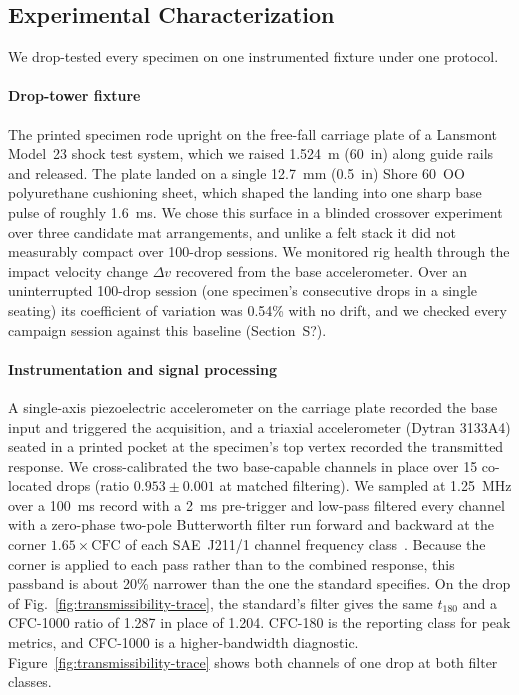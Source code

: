 \documentclass[11pt]{article}
\providecommand{\siref}[1]{S?}
\begin{document}
\subsection{Experimental Characterization}
\label{sec:methods:testing}

We drop-tested every specimen on one instrumented fixture under one
protocol.

\paragraph{Drop-tower fixture} The printed specimen rode upright on the
free-fall carriage plate of a Lansmont Model~23 shock test system, which
we raised \SI{1.524}{m} (\SI{60}{in}) along guide rails and released.
The plate landed on a single \SI{12.7}{mm} (\SI{0.5}{in}) Shore 60~OO polyurethane
cushioning sheet, which shaped the landing into one sharp base pulse of
roughly \SI{1.6}{ms}. We chose this surface in a blinded crossover
experiment over three candidate mat arrangements, and unlike a felt
stack it did not measurably compact over 100-drop sessions. We monitored
rig health through the impact velocity change $\Delta v$ recovered from
the base accelerometer. Over an uninterrupted 100-drop session (one
specimen's consecutive drops in a single seating) its
coefficient of variation was 0.54\% with no drift, and we checked every
campaign session against this baseline (Section~\siref{si:drop}).

\paragraph{Instrumentation and signal processing} A single-axis
piezoelectric accelerometer on the carriage plate recorded the base
input and triggered the acquisition, and a triaxial accelerometer
(Dytran 3133A4) seated in a printed pocket at the specimen's top vertex
recorded the transmitted response. We cross-calibrated the two
base-capable channels in place over 15 co-located drops (ratio
$0.953 \pm 0.001$ at matched filtering). We sampled at \SI{1.25}{MHz}
over a \SI{100}{ms} record with a \SI{2}{ms} pre-trigger and low-pass
filtered every channel with a zero-phase two-pole Butterworth filter run
forward and backward at the corner $1.65 \times \mathrm{CFC}$ of each
SAE~J211/1 channel frequency class~\citep{saej211}. Because the corner
is applied to each pass rather than to the combined response, this
passband is about 20\% narrower than the one the standard specifies. On
the drop of Fig.~\ref{fig:transmissibility-trace}, the standard's
filter gives the same $t_{180}$ and a CFC-1000 ratio of 1.287 in place of
1.204. CFC-180 is the reporting class for peak metrics, and
CFC-1000 is a higher-bandwidth diagnostic.
Figure~\ref{fig:transmissibility-trace} shows both channels of one drop
at both filter classes.
\end{document}
